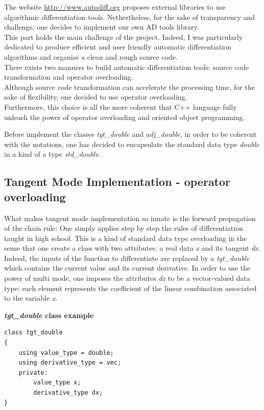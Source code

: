 \documentclass {article}
\begin{document}
		The website \url{http://www.autodiff.org} proposes external libraries to use algorithmic differentiation tools. Nethertheless, for the sake of transparency and challenge, one decides to implement our own AD tools library. \\
		This part holds the main challenge of the project. Indeed, I was particularly dedicated to produce efficient and user friendly automatic differentiation algorithms and organise a clean and rough source code. \\
		There exists two manners to build automatic differentiation tools: source code transformation and operator overloading. \\
		Although source code transformation can accelerate the processing time, for the sake of flexibility, one decided to use operator overloading. \\
		Furthermore, this choice is all the more coherent that C++ language fully unleash the power of operator overloading and oriented object programming.
		
		Before implement the classes \textit{tgt\_double} and \textit{adj\_double}, in order to be coherent with the notations, one has decided to encapsulate the standard data type \textit{double} in a kind of a type \textit{std\_double}.
		
		\subsection {Tangent Mode Implementation - operator overloading}
		
			What makes tangent mode implementation so innate is the forward propagation of the chain rule:
			One simply applies step by step the rules of differentiation taught in high school. 
			This is a kind of standard data type overloading in the sense that one create a class with two attributes: a real data \textit{x} and its tangent \textit{dx}.
			Indeed, the inputs of the function to differentiate are replaced by a \textit{tgt\_double} which contains the current value and its current derivative.
			In order to use the power of multi mode, one imposes the attributes \textit{dx} to be a vector-valued data type: each element represents the coefficient of the linear combination associated to the variable \textit{x}.

			\begin{frameth}
			\textbf{\textit{tgt\_double} class example}			
\begin{lstlisting}				
class tgt_double
{
    using value_type = double;
    using derivative_type = vec;
    private:
        value_type x; 
        derivative_type dx;
}
\end{lstlisting}
			\end{frameth}
			
\end{document}

